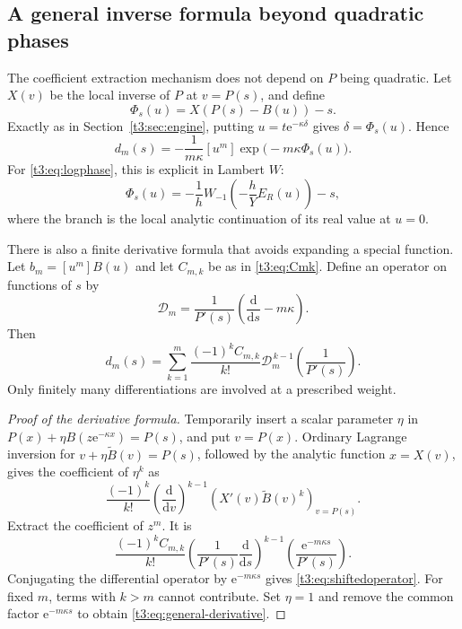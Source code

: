 \documentclass[11pt,openany]{book}
\numberwithin{equation}{chapter}
\theoremstyle{plain}
\theoremstyle{definition}
\theoremstyle{remark}
\newcommand{\ee}{\mathrm e}
\newcommand{\ddn}{\mathrm d}                  %
\begin{document}
\subsection{A general inverse formula beyond quadratic phases}

The coefficient extraction mechanism does not depend on $P$ being quadratic. Let $X(v)$ be the local inverse of $P$ at $v=P(s)$, and define
\begin{equation}\label{t3:eq:generalPhi}
 \Phi_s(u)=X(P(s)-B(u))-s.
\end{equation}
Exactly as in Section~\ref{t3:sec:engine}, putting
$u=t\ee^{-\kappa\delta}$ gives $\delta=\Phi_s(u)$. Hence
\begin{equation}\label{t3:eq:general-inverse-extraction}
 d_m(s)=-\frac1{m\kappa}[u^m]\exp\bigl(-m\kappa\Phi_s(u)\bigr).
\end{equation}
For \eqref{t3:eq:logphase}, this is explicit in Lambert $W$:
\begin{equation}\label{t3:eq:W-Phi}
 \Phi_s(u)=-\frac1h W_{-1}\!\left(-\frac hY E_R(u)\right)-s,
\end{equation}
where the branch is the local analytic continuation of its real value at $u=0$.

There is also a finite derivative formula that avoids expanding a special function. Let $b_m=[u^m]B(u)$ and let $C_{m,k}$ be as in \eqref{t3:eq:Cmk}. Define an operator on functions of $s$ by
\begin{equation}\label{t3:eq:shiftedoperator}
 \mathcal D_m=\frac1{P'(s)}\left(\frac{\ddn}{\ddn s}-m\kappa\right).
\end{equation}
Then
\begin{equation}\label{t3:eq:general-derivative}
 \boxed{\displaystyle
 d_m(s)=\sum_{k=1}^m\frac{(-1)^kC_{m,k}}{k!}
             \mathcal D_m^{\,k-1}\left(\frac1{P'(s)}\right).}
\end{equation}
Only finitely many differentiations are involved at a prescribed weight.

\begin{proof}[Proof of the derivative formula]
Temporarily insert a scalar parameter $\eta$ in
$P(x)+\eta B(z\ee^{-\kappa x})=P(s)$, and put $v=P(x)$. Ordinary Lagrange inversion for
$v+\eta\widetilde B(v)=P(s)$, followed by the analytic function $x=X(v)$, gives the coefficient of $\eta^k$ as
\[
 \frac{(-1)^k}{k!}
 \left(\frac{\ddn}{\ddn v}\right)^{k-1}
 \left(X'(v)\widetilde B(v)^k\right)_{v=P(s)}.
\]
Extract the coefficient of $z^m$. It is
\[
 \frac{(-1)^k C_{m,k}}{k!}
 \left(\frac1{P'(s)}\frac{\ddn}{\ddn s}\right)^{k-1}
 \left(\frac{\ee^{-m\kappa s}}{P'(s)}\right).
\]
Conjugating the differential operator by $\ee^{-m\kappa s}$ gives \eqref{t3:eq:shiftedoperator}. For fixed $m$, terms with $k>m$ cannot contribute. Set $\eta=1$ and remove the common factor $\ee^{-m\kappa s}$ to obtain \eqref{t3:eq:general-derivative}.
\end{proof}
\end{document}
